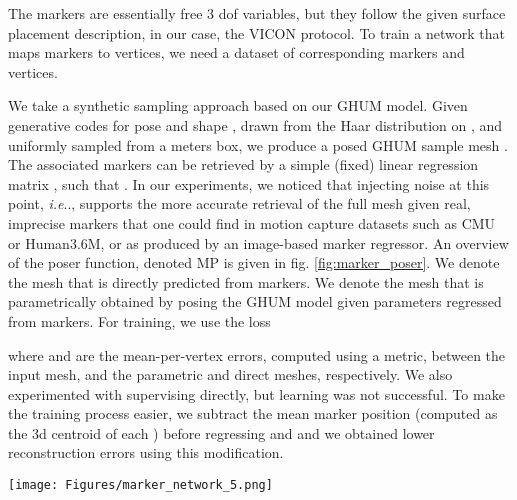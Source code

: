 \documentclass[10pt,twocolumn,letterpaper]{article}
\makeatletter
\DeclareRobustCommand\onedot{\futurelet\@let@token\@onedot}
\def\@onedot{\ifx\@let@token.\else.\null\fi\xspace}
\def\ie{\emph{i.e}\onedot} \def\Ie{\emph{I.e}\onedot}
\makeatother
\begin{document}
The markers are essentially free 3 dof variables, but they follow the given surface placement description, in our case, the VICON protocol. To train a network that maps markers to vertices, we need a dataset of corresponding markers and vertices. 

We take a synthetic sampling approach based on our GHUM model. Given generative codes for pose and shape ,  drawn from the Haar distribution on , and  uniformly sampled from a  meters box, we produce a posed GHUM  sample mesh . The associated markers can be retrieved by a simple (fixed) linear regression matrix , such that . In our experiments, we noticed that injecting noise at this point, \ie , supports the more accurate retrieval of the full mesh given real, imprecise markers that one could find in motion capture datasets such as CMU or Human3.6M, or as produced by an image-based marker regressor.
An overview of the poser function, denoted MP is given in fig. \ref{fig:marker_poser}. We denote  the mesh that is directly predicted from markers. We denote  the mesh that is parametrically obtained by posing the GHUM model given parameters  regressed from markers. For training, we use the loss

\noindent where  and  are the mean-per-vertex errors, computed using a  metric, between the input mesh, and the parametric and direct meshes, respectively. We also experimented with supervising  directly, but learning was not successful. 
To make the training process easier, we subtract the mean marker position (computed as the 3d centroid of each ) before regressing  and  and we obtained lower reconstruction errors using this modification.



\begin{figure*}[!tbp]
\begin{center}
\texttt{[image: Figures/marker\_network\_5.png]}
\end{center}
\vspace{-5mm}
\caption{\small Our marker poser is based on a constrained marker-prediction pipeline which auto-encodes an initially generated, body mesh that is consistent with the human anthropometry  into a set of markers  via a linear layer characterized by a matrix . The markers are then used to predict both the GHUM parameters, resulting in a mesh  (we center the markers before regressing  and ) and a free-form mesh . Training losses ensure the consistency between ,  and .  We also show a detail of the cannonical marker placement, as attached on the GHUM model. Notice slight left/right and more pronounced front/back placement asymmetries that help disambiguate the model side and facing direction.
}
\label{fig:marker_poser}
\end{figure*}
\end{document}
